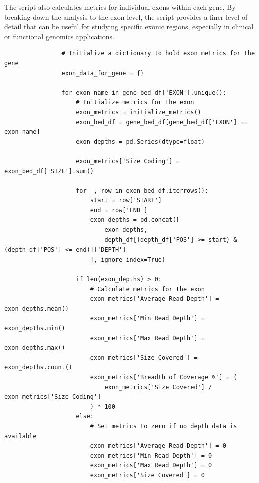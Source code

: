 The script also calculates metrics for individual exons within each gene. By breaking down the analysis to the exon level, the script provides a finer level of detail that can be useful for studying specific exonic regions, especially in clinical or functional genomics applications.

\begin{longlisting}
\begin{verbatim}
                # Initialize a dictionary to hold exon metrics for the gene
                exon_data_for_gene = {}
                
                for exon_name in gene_bed_df['EXON'].unique():
                    # Initialize metrics for the exon
                    exon_metrics = initialize_metrics()
                    exon_bed_df = gene_bed_df[gene_bed_df['EXON'] == exon_name]
                    exon_depths = pd.Series(dtype=float)
                    
                    exon_metrics['Size Coding'] = exon_bed_df['SIZE'].sum()

                    for _, row in exon_bed_df.iterrows():
                        start = row['START']
                        end = row['END']
                        exon_depths = pd.concat([
                            exon_depths,
                            depth_df[(depth_df['POS'] >= start) & (depth_df['POS'] <= end)]['DEPTH']
                        ], ignore_index=True)

                    if len(exon_depths) > 0:
                        # Calculate metrics for the exon
                        exon_metrics['Average Read Depth'] = exon_depths.mean()
                        exon_metrics['Min Read Depth'] = exon_depths.min()
                        exon_metrics['Max Read Depth'] = exon_depths.max()
                        exon_metrics['Size Covered'] = exon_depths.count()
                        exon_metrics['Breadth of Coverage %'] = (
                            exon_metrics['Size Covered'] / exon_metrics['Size Coding']
                        ) * 100
                    else:
                        # Set metrics to zero if no depth data is available
                        exon_metrics['Average Read Depth'] = 0
                        exon_metrics['Min Read Depth'] = 0
                        exon_metrics['Max Read Depth'] = 0
                        exon_metrics['Size Covered'] = 0


\end{verbatim}
\end{longlisting}
